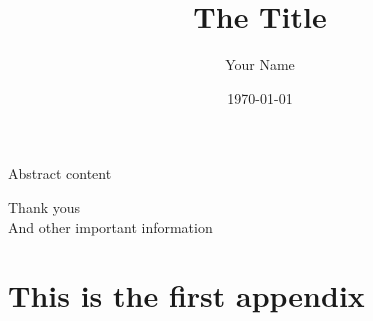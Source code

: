 \documentclass[12pt, a4paper, twoside]{book} %
\author{Your Name}
\title{The Title}
\date{\today}
\newenvironment{abstract}%
{\cleardoublepage \null \vfill \begin{center}%
		\bfseries \abstractname \end{center}}%
{\vfill\null}
\begin{document}
	
	\frontmatter
	
	\begin{titlepage}
		\maketitle
	\end{titlepage}
	
	\begin{abstract}
		Abstract content
	\end{abstract}

	\clearpage\mbox{}\clearpage %

	{\centering Thank yous\\}
	\vfill
	And other important information

	\clearpage\mbox{}\clearpage %
	
	\tableofcontents %
	\listoffigures %
	\listoftables %
	\lstlistoflistings %
	
	\cleardoublepage %
	
	\mainmatter
	
	\pagestyle{fancy}
	
	
	
	\appendix
	
	\chapter{This is the first appendix}
	
	\cleardoublepage
	\printbibliography[heading=bibintoc] %
	
	\backmatter
	
\end{document}

